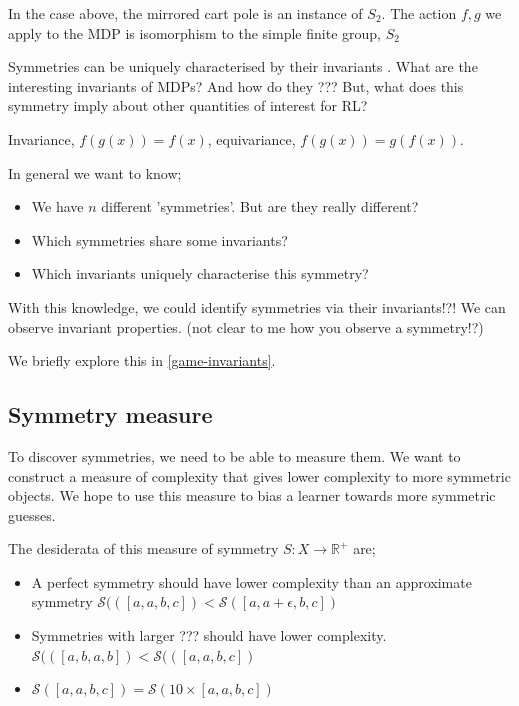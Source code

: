 In the case above, the mirrored cart pole is an instance of $S_2$.
The action $f, g$ we apply to the MDP is isomorphism to the simple finite group, $S_2$

Symmetries can be uniquely characterised by their invariants \cite{PeterOlver1999}.
What are the interesting invariants of MDPs? And how do they ???
But, what does this symmetry imply about other quantities of interest for RL?

Invariance, $f(g(x)) = f(x)$, equivariance, $f(g(x)) = g(f(x))$.

In general we want to know;

\begin{itemize}
	\tightlist
	\item We have $n$ different 'symmetries'. But are they really different?
	\item Which symmetries share some invariants?
	\item Which invariants uniquely characterise this symmetry?
\end{itemize}

With this knowledge, we could identify symmetries via their invariants!?!
We can observe invariant properties. (not clear to me how you observe a symmetry!?)

We briefly explore this in \ref{game-invariants}.

\subsection{Symmetry measure}

To discover symmetries, we need to be able to measure them.
We want to construct a measure of complexity that gives lower complexity to more symmetric objects.
We hope to use this measure to bias a learner towards more symmetric guesses.

The desiderata of this measure of symmetry $S: X \to \mathbb R^+$ are;

\begin{itemize}
	\tightlist
	\item A perfect symmetry should have lower complexity than an approximate symmetry $\mathcal S(([a,a,b,c]) < \mathcal S([a,a+\epsilon,b,c])$
	\item Symmetries with larger ??? should have lower complexity. $\mathcal S(([a,b,a,b]) < \mathcal S(([a,a,b,c])$
	\item $\mathcal S([a,a,b,c]) = \mathcal S(10 \times [a,a,b,c])$
\end{itemize}

